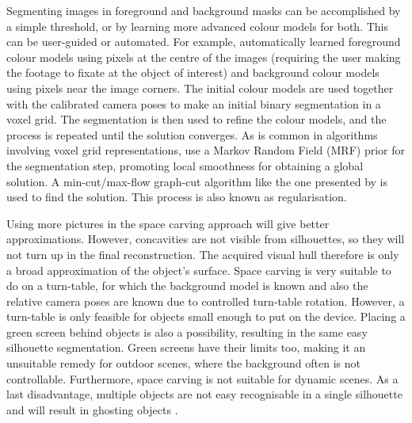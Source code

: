 Segmenting images in foreground and background masks can be accomplished by a simple threshold, or by learning more advanced colour models for both. This can be user-guided or automated. For example,  automatically learned foreground colour models using pixels at the centre of the images (requiring the user making the footage to fixate at the object of interest) and background colour models using pixels near the image corners. The initial colour models are used together with the calibrated camera poses to make an initial binary segmentation in a voxel grid. The segmentation is then used to refine the colour models, and the process is repeated until the solution converges. As is common in algorithms involving voxel grid representations,  use a Markov Random Field (MRF) prior for the segmentation step, promoting local smoothness for obtaining a global solution. A min-cut/max-flow graph-cut algorithm like the one presented by  is used to find the solution. This process is also known as regularisation.

Using more pictures in the space carving approach will give better approximations. However, concavities are not visible from silhouettes, so they will not turn up in the final reconstruction. The acquired visual hull therefore is only a broad approximation of the object's surface. Space carving is very suitable to do on a turn-table, for which the background model is known and also the relative camera poses are known due to controlled turn-table rotation. However, a turn-table is only feasible for objects small enough to put on the device. Placing a green screen behind objects is also a possibility, resulting in the same easy silhouette segmentation. Green screens have their limits too, making it an unsuitable remedy for outdoor scenes, where the background often is not controllable. Furthermore, space carving is not suitable for dynamic scenes. As a last disadvantage, multiple objects are not easy recognisable in a single silhouette and will result in ghosting objects \cite{Guan2007}.

